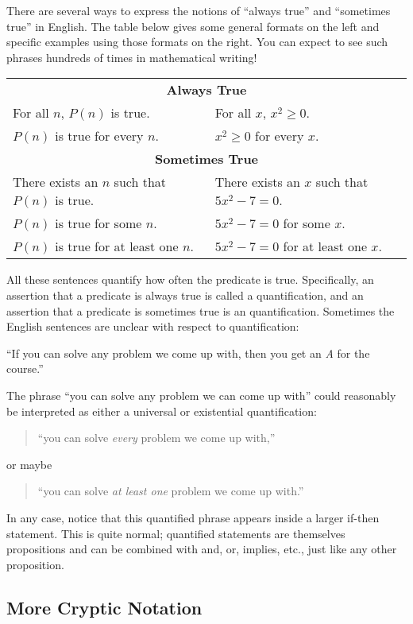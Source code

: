 There are several ways to express the notions of ``always true'' and
``sometimes true'' in English.  The table below gives some general
formats on the left and specific examples using those formats on the
right.  You can expect to see such phrases hundreds of times in
mathematical writing!
%
\begin{center}
\begin{tabular}{ll}
\multicolumn{2}{c}{\textbf{Always True}} \\[1ex]
For all $n$, $P(n)$ is true. & For all $x$, $x^2 \geq 0$. \\
$P(n)$ is true for every $n$. & $x^2 \geq 0$ for every $x$. \\[2ex]
\multicolumn{2}{c}{\textbf{Sometimes True}} \\[1ex]
There exists an $n$ such that $P(n)$ is true. & There exists an $x$ such that $5x^2 - 7 = 0$.\\
$P(n)$ is true for some $n$. & $5x^2 - 7 = 0$ for some $x$.\\
$P(n)$ is true for at least one $n$. & $5x^2-7=0$ for at least one $x$.
\end{tabular}
\end{center}

All these sentences quantify how often the predicate is true.
Specifically, an assertion that a predicate is always true is called a
 quantification, and an assertion that a predicate is
sometimes true is an  quantification.  Sometimes the
English sentences are unclear with respect to quantification:
%
\begin{center}
  ``If you can solve any problem we come up with, then you get an \emph{A}
  for the course.''
\end{center}
%
The phrase ``you can solve any problem we can come up with'' could
reasonably be interpreted as either a universal or existential
quantification:
%
\begin{quote}
``you can solve \textit{every} problem we come up with,''
\end{quote}
or maybe
\begin{quote}
``you can solve \textit{at least one} problem we come up with.''
\end{quote}
%
In any case, notice that this quantified phrase appears inside a
larger if-then statement.  This is quite normal; quantified statements
are themselves propositions and can be combined with and, or, implies,
etc., just like any other proposition.

\subsection{More Cryptic Notation}

